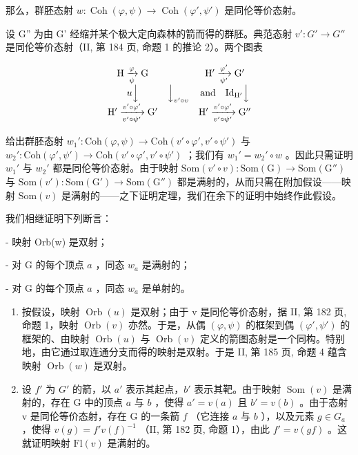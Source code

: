 那么，群胚态射 \(w\colon \operatorname{Coh}(\varphi,\psi)\to\operatorname{Coh}(\varphi',\psi')\) 是同伦等价态射。

设 G'' 为由 G' 经缩并某个极大定向森林的箭而得的群胚。典范态射 \(v'\colon G' \to G''\) 是同伦等价态射（II, 第 184 页, 命题 1 的推论 2）。两个图表

\[
\begin{array}{c c c} \mathrm{H} \xrightarrow [ \psi ]{\varphi} \mathrm{G} & & \mathrm{H} ^ {\prime} \xrightarrow [ \psi^ {\prime} ]{\varphi^ {\prime}} \mathrm{G} ^ {\prime} \\ u \Big \downarrow & \Big \downarrow_ {v ^ {\prime} \circ v} & \text {and} \quad \mathrm{Id} _ {\mathrm{H} ^ {\prime}} \Big \downarrow \\ \mathrm{H} ^ {\prime} \xrightarrow [ v ^ {\prime} \circ \psi^ {\prime} ]{v ^ {\prime} \circ \varphi^ {\prime}} \mathrm{G} ^ {\prime} & & \mathrm{H} ^ {\prime} \xrightarrow [ v ^ {\prime} \circ \psi^ {\prime} ]{v ^ {\prime} \circ \varphi^ {\prime}} \mathrm{G} ^ {\prime \prime} \end{array}
\]

给出群胚态射 \(w_1' \colon \mathrm{Coh}(\varphi, \psi) \to \mathrm{Coh}(v' \circ \varphi', v' \circ \psi')\) 与 \(w_2' \colon \mathrm{Coh}(\varphi', \psi') \to \mathrm{Coh}(v' \circ \varphi', v' \circ \psi')\) ；我们有 \(w_1' = w_2' \circ w\) 。因此只需证明 \(w_1'\) 与 \(w_2'\) 都是同伦等价态射。由于映射 \(\mathrm{Som}(v' \circ v) \colon \mathrm{Som}(\mathrm{G}) \to \mathrm{Som}(\mathrm{G}'' )\) 与 \(\mathrm{Som}(v') \colon \mathrm{Som}(\mathrm{G}') \to \mathrm{Som}(\mathrm{G}'' )\) 都是满射的，从而只需在附加假设——映射 \(\mathrm{Som}(v)\) 是满射的——之下证明定理，我们在余下的证明中始终作此假设。

我们相继证明下列断言：

- 映射 Orb(w) 是双射；

- 对 G 的每个顶点 \(a\) ，同态 \(w_{a}\) 是满射的；

- 对 G 的每个顶点 \(a\) ，同态 \(w_{a}\) 是单射的。

\begin{enumerate}
\def\labelenumi{\alph{enumi})}
\item
  按假设，映射 \(\operatorname{Orb}(u)\) 是双射；由于 v 是同伦等价态射，据 II, 第 182 页, 命题 1，映射 \(\operatorname{Orb}(v)\) 亦然。于是，从偶 \((\varphi,\psi)\) 的框架到偶 \((\varphi',\psi')\) 的框架的、由映射 \(\operatorname{Orb}(u)\) 与 \(\operatorname{Orb}(v)\) 定义的箭图态射是一个同构。特别地，由它通过取连通分支而得的映射是双射。于是 II, 第 185 页, 命题 4 蕴含映射 \(\operatorname{Orb}(w)\) 是双射。
\item
  设 \(f'\) 为 \(G'\) 的箭，以 \(a'\) 表示其起点，\(b'\) 表示其靶。由于映射 \(\operatorname{Som}(v)\) 是满射的，存在 G 中的顶点 \(a\) 与 \(b\) ，使得 \(a' = v(a)\) 且 \(b' = v(b)\) 。由于态射 v 是同伦等价态射，存在 G 的一条箭 \(f\) （它连接 \(a\) 与 \(b\) ），以及元素 \(g \in G_{a}\) ，使得 \(v(g) = f'v(f)^{-1}\) （II, 第 182 页, 命题 1），由此 \(f' = v(gf)\) 。这就证明映射 \(\mathrm{Fl}(v)\) 是满射的。
\end{enumerate}

